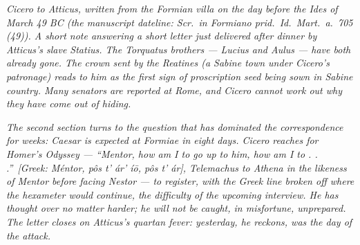 
\textit{Cicero to Atticus, written from the Formian
villa on the day before the Ides of March 49 BC (the
manuscript dateline: \textit{Scr.\ in Formiano prid.\
Id.\ Mart.\ a.\ 705 (49)}). A short note answering a
short letter just delivered after dinner by Atticus's
slave Statius. The Torquatus brothers --- Lucius and
Aulus --- have both already gone. The crown sent by the
Reatines (a Sabine town under Cicero's patronage) reads
to him as the first sign of proscription seed being
sown in Sabine country. Many senators are reported at
Rome, and Cicero cannot work out why they have come
out of hiding.}

\textit{The second section turns to the question that
has dominated the correspondence for weeks: Caesar is
expected at Formiae in eight days. Cicero reaches for
Homer's Odyssey --- ``Mentor, how am I to go up to him,
how am I to . . .''\ \textit{[Greek: M\'entor, p\^os t'
\'ar' \'i\=o, p\^os t' \'ar]}, Telemachus to Athena in
the likeness of Mentor before facing Nestor --- to
register, with the Greek line broken off where the
hexameter would continue, the difficulty of the
upcoming interview. He has thought over no matter
harder; he will not be caught, in misfortune,
unprepared. The letter closes on Atticus's quartan
fever: yesterday, he reckons, was the day of the
attack.}
